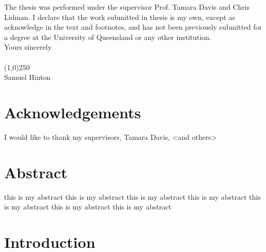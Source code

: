 \documentclass[titlesmallcaps, examinerscopy, copyrightpage]{uqthesis}
\begin{document}
\noindent The thesis was performed under the supervisor Prof. Tamara Davis and Chris Lidman. I declare that the work submitted in thesis is my own, except as acknowledge in the text and footnotes, and has not been previously submitted for a degree at the University of Queensland or any other institution. \\

\noindent Yours sincerely \\ \\ 

\noindent \line(1,0){250} \\

\noindent Samuel Hinton


\chapter{Acknowledgements}

I would like to thank my supervisors, Tamara Davis, <and others>


\chapter{Abstract}

this is my abstract 
this is my abstract 
this is my abstract 
this is my abstract 
this is my abstract 
this is my abstract 
this is my abstract 

\hypersetup{pageanchor=true}

\tableofcontents


\mainmatter


\chapter{Introduction}
\end{document}
